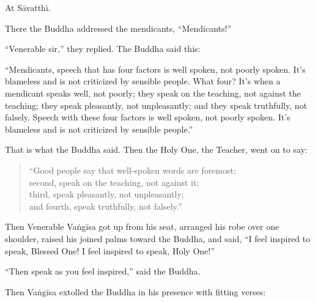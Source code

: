 \documentclass[12pt,openany]{book}%
\begin{document}
At \textsanskrit{Sāvatthī}. 

There the Buddha addressed the mendicants, “Mendicants!” 

“Venerable sir,” they replied. The Buddha said this: 

“Mendicants, speech that has four factors is well spoken, not poorly spoken. It’s blameless and is not criticized by sensible people. What four? It’s when a mendicant speaks well, not poorly; they speak on the teaching, not against the teaching; they speak pleasantly, not unpleasantly; and they speak truthfully, not falsely. Speech with these four factors is well spoken, not poorly spoken. It’s blameless and is not criticized by sensible people.” 

That is what the Buddha said. Then the Holy One, the Teacher, went on to say: 

\begin{verse}%
“Good people say that well-spoken words are foremost; \\
second, speak on the teaching, not against it; \\
third, speak pleasantly, not unpleasantly; \\
and fourth, speak truthfully, not falsely.” 

%
\end{verse}

Then Venerable \textsanskrit{Vaṅgīsa} got up from his seat, arranged his robe over one shoulder, raised his joined palms toward the Buddha, and said, “I feel inspired to speak, Blessed One! I feel inspired to speak, Holy One!” 

“Then speak as you feel inspired,” said the Buddha. 

Then \textsanskrit{Vaṅgīsa} extolled the Buddha in his presence with fitting verses: 
\end{document}
